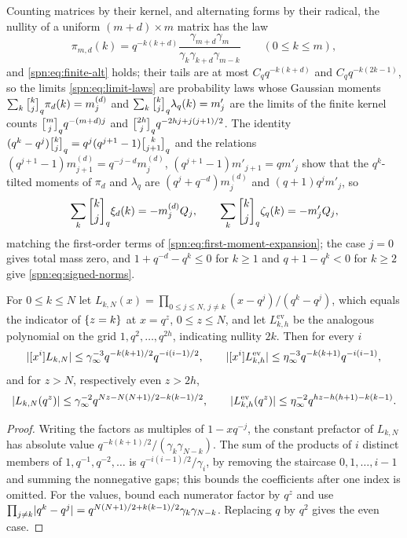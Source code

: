Counting matrices by their kernel, and alternating forms by their radical, the nullity of a uniform
$(m+d)\times m$ matrix has the law
\begin{equation}\label{spn:eq:finite-rect}
 \pi_{m,d}(k)=q^{-k(k+d)}\frac{\gamma_{m+d}\gamma_m}{\gamma_k\gamma_{k+d}\gamma_{m-k}}\qquad
 (0\le k\le m),
\end{equation}
and \eqref{spn:eq:finite-alt} holds; their tails are at most $C_qq^{-k(k+d)}$ and
$C_qq^{-k(2k-1)}$, so the limits \eqref{spn:eq:limit-laws} are probability laws whose Gaussian
moments $\sum_k\spnqbin kjq\pi_d(k)=m_j^{(d)}$ and $\sum_k\spnqbin kjq\lambda_q(k)=m'_j$ are the
limits of the finite kernel counts $\spnqbin mjqq^{-(m+d)j}$ and $\spnqbin{2h}jqq^{-2hj+j(j+1)/2}$.
The identity $(q^k-q^j)\spnqbin kjq=q^j(q^{j+1}-1)\spnqbin k{j+1}q$ and the relations
$(q^{j+1}-1)m_{j+1}^{(d)}=q^{-j-d}m_j^{(d)}$, $(q^{j+1}-1)m'_{j+1}=qm'_j$ show that the
$q^k$-tilted moments of $\pi_d$ and $\lambda_q$ are $(q^j+q^{-d})m_j^{(d)}$ and $(q+1)q^jm'_j$, so
\begin{equation}\label{spn:eq:signed-moments}
 \sum_k\spnqbin kjq\xi_d(k)=-m_j^{(d)}Q_j,\qquad
 \sum_k\spnqbin kjq\zeta_q(k)=-m'_jQ_j,
\end{equation}
matching the first-order terms of \eqref{spn:eq:first-moment-expansion}; the case $j=0$ gives
total mass zero, and $1+q^{-d}-q^k\le0$ for $k\ge1$ and $q+1-q^k<0$ for $k\ge2$ give
\eqref{spn:eq:signed-norms}.

\begin{lemma}\label{spn:lem:interpolation}
For $0\le k\le N$ let $L_{k,N}(x)=\prod_{0\le j\le N,\,j\ne k}(x-q^j)/(q^k-q^j)$, which equals the
indicator of $\{z=k\}$ at $x=q^z$, $0\le z\le N$, and let $L^{\mathrm{ev}}_{k,h}$ be the analogous
polynomial on the grid $1,q^2,\dots,q^{2h}$, indicating nullity $2k$. Then for every $i$
\[
 \lvert[x^i]L_{k,N}\rvert\le\gamma_\infty^{-3}q^{-k(k+1)/2}q^{-i(i-1)/2},\qquad
 \lvert[x^i]L^{\mathrm{ev}}_{k,h}\rvert\le\eta_\infty^{-3}q^{-k(k+1)}q^{-i(i-1)},
\]
and for $z>N$, respectively even $z>2h$,
\[
 \lvert L_{k,N}(q^z)\rvert\le\gamma_\infty^{-2}q^{Nz-N(N+1)/2-k(k-1)/2},\qquad
 \lvert L^{\mathrm{ev}}_{k,h}(q^z)\rvert\le\eta_\infty^{-2}q^{hz-h(h+1)-k(k-1)}.
\]
\end{lemma}

\begin{proof}
Writing the factors as multiples of $1-xq^{-j}$, the constant prefactor of $L_{k,N}$ has
absolute value $q^{-k(k+1)/2}/(\gamma_k\gamma_{N-k})$. The sum of the products of $i$ distinct
members of $1,q^{-1},q^{-2},\dots$ is $q^{-i(i-1)/2}/\gamma_i$, by removing the staircase
$0,1,\dots,i-1$ and summing the nonnegative gaps; this bounds the coefficients after one index is
omitted. For the values, bound each numerator factor by $q^z$ and use
$\prod_{j\ne k}\lvert q^k-q^j\rvert=q^{N(N+1)/2+k(k-1)/2}\gamma_k\gamma_{N-k}$. Replacing $q$ by $q^2$ gives
the even case.
\end{proof}

